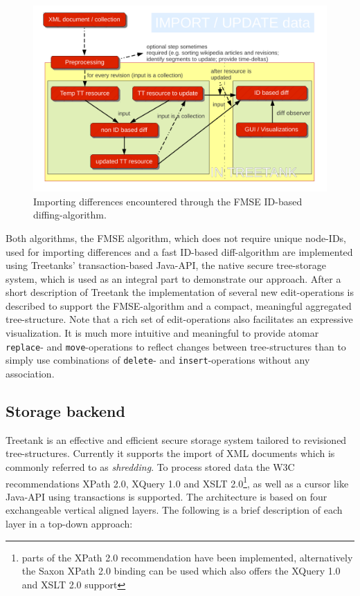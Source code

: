 \begin{figure}[tb]
\centering
\includegraphics[width=\textwidth]{figures/importdata}
\caption{Importing differences encountered through the FMSE ID-based diffing-algorithm.} 
\label{fig:importdata}
\end{figure}

Both algorithms, the FMSE algorithm, which does not require unique node-IDs, used for importing differences and a fast ID-based diff-algorithm are implemented using Treetanks' transaction-based Java-API, the native secure tree-storage system, which is used as an integral part to demonstrate our approach. After a short description of Treetank the implementation of several new edit-operations is described to support the FMSE-algorithm and a compact, meaningful aggregated tree-structure. Note that a rich set of edit-operations also facilitates an expressive visualization. It is much more intuitive and meaningful to provide atomar \texttt{replace}- and \texttt{move}-operations to reflect changes between tree-structures than to simply use combinations of \texttt{delete}- and \texttt{insert}-operations without any association. 

\subsection{Storage backend}
Treetank is an effective and efficient secure storage system tailored to revisioned tree-structures. Currently it supports the import of XML documents which is commonly referred to as \emph{shredding}. To process stored data the W3C recommendations XPath 2.0, XQuery 1.0 and XSLT 2.0\footnote{parts of the XPath 2.0 recommendation have been implemented, alternatively the Saxon XPath 2.0 binding can be used which also offers the XQuery 1.0 and XSLT 2.0 support}, as well as a cursor like Java-API using transactions is supported. The architecture is based on four exchangeable vertical aligned layers. The following is a brief description of each layer in a top-down approach:

